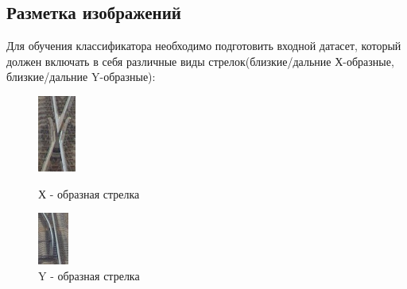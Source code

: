 \subsection{Разметка изображений}
Для обучения классификатора необходимо подготовить входной датасет, который должен включать в себя различные виды стрелок(близкие/дальние Х-образные, близкие/дальние Y-образные):
\begin{figure}[!h]
	\centering
	\begin{minipage}{0.3\textwidth}
		\centering
		\includegraphics[width=0.3\linewidth]{pictures/screenshot3}
		\caption[X]{Х - образная стрелка}
		\label{fig:x}
	\end{minipage}
	\begin{minipage}{0.3\textwidth}
		\centering
		\includegraphics[width=0.3\linewidth]{pictures/screenshot4}
		\caption[Y]{Y - образная стрелка}
		\label{fig:y}
	\end{minipage}
\end{figure}

